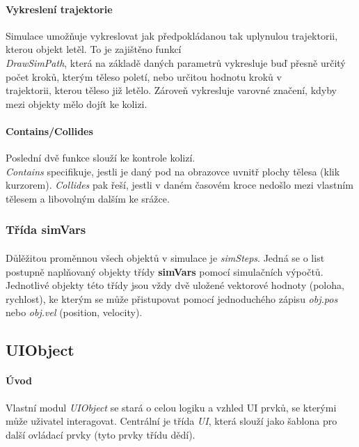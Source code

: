 \documentclass[a4paper, 12pt]{article}
\begin{document}
\paragraph{Vykreslení trajektorie}
Simulace umožňuje vykreslovat jak předpokládanou tak uplynulou trajektorii,
kterou objekt letěl. To je zajištěno funkcí \\\emph{DrawSimPath}, která na základě
daných parametrů vykresluje buď přesně určitý počet kroků, kterým těleso
poletí, nebo určitou hodnotu kroků v \\trajektorii, kterou těleso již letělo.
Zároveň vykresluje varovné značení, kdyby mezi objekty mělo dojít ke kolizi.

\paragraph{Contains/Collides}
Poslední dvě funkce slouží ke kontrole kolizí. \\\emph{Contains} specifikuje,
jestli je daný pod na obrazovce uvnitř plochy tělesa (klik kurzorem).
\emph{Collides} pak řeší, jestli v daném časovém kroce nedošlo mezi vlastním
tělesem a libovolným dalším ke srážce.
\\
\subsubsection{Třída simVars}
\paragraph{}
Důlěžitou proměnnou všech objektů v simulace je \emph{simSteps}. Jedná se o
list postupně naplňovaný objekty třídy \textbf{simVars} pomocí simulačních
výpočtů. Jednotlivé objekty této třídy jsou vždy dvě uložené vektorové hodnoty
(poloha, rychlost), ke kterým se může přistupovat pomocí jednoduchého zápisu
\emph{obj.pos} nebo \emph{obj.vel} (position, velocity).
\newpage

\subsection{UIObject}
\paragraph{Úvod}
Vlastní modul \emph{UIObject} se stará o celou logiku a vzhled UI prvků, se kterými
může uživatel interagovat. Centrální je třída \emph{UI}, která slouží jako
šablona pro další ovládací prvky (tyto prvky třídu dědí). 
\end{document}
